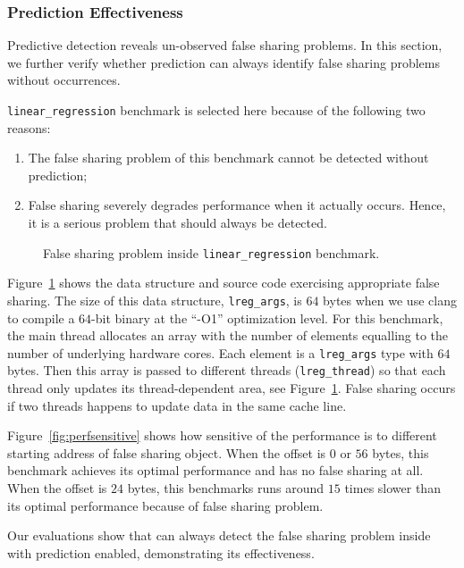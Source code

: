 \subsubsection{Prediction Effectiveness}
\label{sec:predicteval}
Predictive detection reveals un-observed false sharing problems. In this section, we further verify whether prediction can always identify false sharing problems without occurrences.

\texttt{linear\_regression} benchmark is selected here because of the following two reasons:
\begin{enumerate}
\item
The false sharing problem of this benchmark cannot be detected without prediction; 
\item
False sharing severely degrades performance when it actually occurs. 
Hence, it is a serious problem that should always be detected. 
\end{enumerate}

\begin{figure}[!ht]
{\centering
\subfigure{}
\caption{False sharing problem inside \texttt{linear\_regression} benchmark.
\label{fig:linearregression}}
}
\end{figure}

Figure~\ref{fig:linearregression} shows the data structure and source code exercising appropriate false sharing. The size of this data structure, \texttt{lreg\_args}, is $64$ bytes 
when we use clang to compile a $64$-bit binary at the ``-O1'' optimization level. For this benchmark, the main thread allocates an array with the number of elements equalling to
the number of underlying hardware cores. Each element is a \texttt{lreg\_args} type with $64$ bytes. Then this array is passed to different threads (\texttt{lreg\_thread}) so that each thread only updates its thread-dependent area, see Figure~\ref{fig:linearregression}. False sharing occurs if two threads happens to update data in the same cache line. 

Figure~\ref{fig:perfsensitive} shows how sensitive  of the performance is to different starting address of false sharing object. When the offset is $0$ or $56$ bytes, this benchmark achieves its optimal performance and has no false sharing at all. When the offset is $24$ bytes, this benchmarks runs around $15$ times slower than its optimal performance because of false sharing problem.

Our evaluations show that \Predator{} can always detect the false sharing problem inside with prediction enabled, demonstrating its effectiveness.

